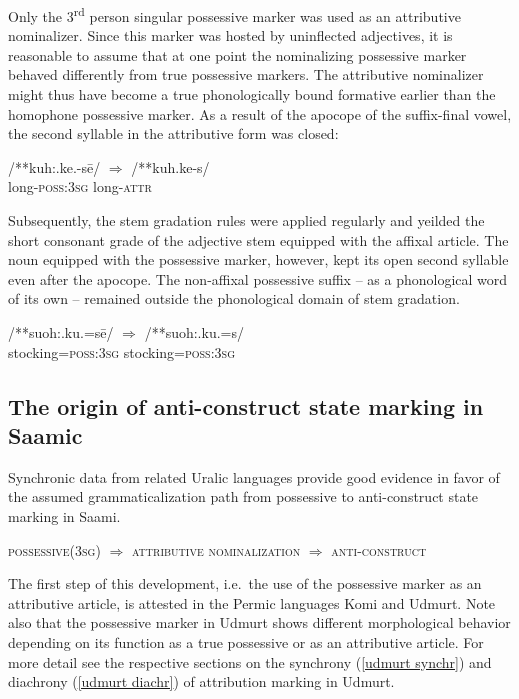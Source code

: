 {Only the 3\textsuperscript{rd} person singular possessive marker was used as an attributive nominalizer. Since this marker was hosted by uninflected adjectives, it is reasonable to assume that at one point the nominalizing possessive marker behaved differently from true possessive markers. The attributive nominalizer might thus have become a true phonologically bound formative earlier than the homophone possessive marker. As a result of the apocope of the suffix-final vowel, the second syllable in the attributive form was closed:
\begin{exe}
\ex 
\gll	/**kuh:.ke.-sē/ $\Rightarrow$ /**kuh.ke-s/\\
	long-\textsc{poss:3sg} {} long-\textsc{attr}\\
\end{exe}
Subsequently, the stem gradation rules were applied regularly and yeilded the short consonant grade of the adjective stem equipped with the affixal article. The noun equipped with the possessive marker, however, kept its open second syllable even after the apocope. The non-affixal possessive suffix – as a phonological word of its own – remained outside the phonological domain of stem gradation.
\begin{exe}
\ex 
\gll	/**suoh:.ku.=sē/ $\Rightarrow$ /**suoh:.ku.=s/\\
	stocking=\textsc{poss:3sg} {} stocking=\textsc{poss:3sg}\\
\end{exe}

\subsection{The origin of anti-construct state marking in Saamic}

Synchronic data from related Uralic languages provide good evidence in favor of the assumed grammaticalization path from possessive to anti-construct state marking in Saami. 

\begin{exe}
\ex \textsc{possessive(3sg)} $\Rightarrow$ \textsc{attributive nominalization} $\Rightarrow$ \textsc{anti}-\textsc{construct}
\end{exe}
The first step of this development, i.e.~the use of the possessive marker as an attributive article, is attested in the Permic languages Komi and Udmurt. Note also that the possessive marker in Udmurt shows different morphological behavior depending on its function as a true possessive or as an attributive article. For more detail see the respective sections on the synchrony (\ref{udmurt synchr}) and diachrony (\ref{udmurt diachr}) of attribution marking in Udmurt.

}
